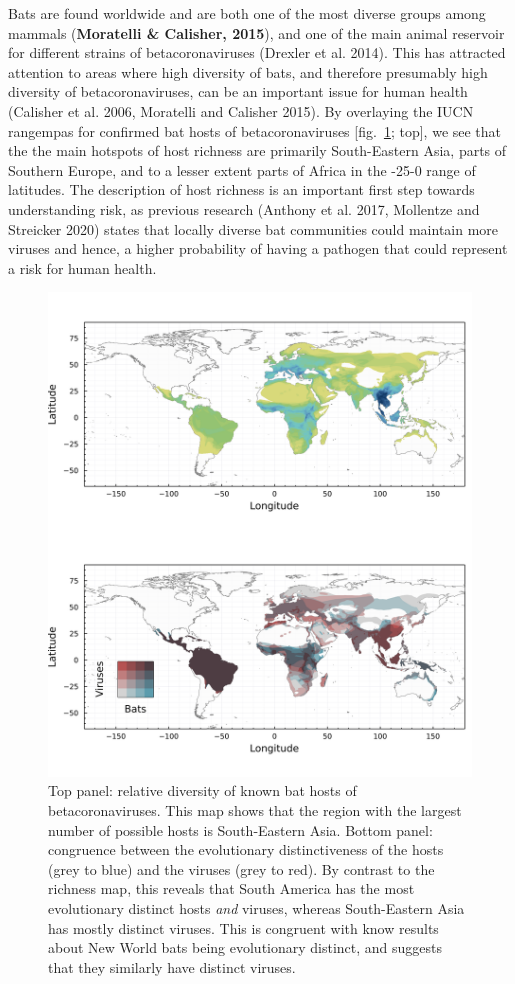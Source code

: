 \documentclass[11pt]{article}
\makeatletter
\def\maxwidth{\ifdim\Gin@nat@width>\linewidth\linewidth
\else\Gin@nat@width\fi}
\let\Oldincludegraphics\includegraphics
\renewcommand{\includegraphics}[1]{\Oldincludegraphics[width=\maxwidth]{#1}}
\makeatother
\begin{document}
Bats are found worldwide and are both one of the most diverse groups
among mammals (\textbf{Moratelli \& Calisher, 2015}), and one of the
main animal reservoir for different strains of betacoronaviruses
(Drexler et al. 2014). This has attracted attention to areas where high
diversity of bats, and therefore presumably high diversity of
betacoronaviruses, can be an important issue for human health (Calisher
et al. 2006, Moratelli and Calisher 2015). By overlaying the IUCN
rangempas for confirmed bat hosts of betacoronaviruses
{[}fig.~\ref{fig:richness}; top{]}, we see that the the main hotspots of
host richness are primarily South-Eastern Asia, parts of Southern
Europe, and to a lesser extent parts of Africa in the -25-0 range of
latitudes. The description of host richness is an important first step
towards understanding risk, as previous research (Anthony et al. 2017,
Mollentze and Streicker 2020) states that locally diverse bat
communities could maintain more viruses and hence, a higher probability
of having a pathogen that could represent a risk for human health.

\begin{figure}
\hypertarget{fig:richness}{%
\centering
\includegraphics{figures/combined_richness.png}
\caption{Top panel: relative diversity of known bat hosts of
betacoronaviruses. This map shows that the region with the largest
number of possible hosts is South-Eastern Asia. Bottom panel: congruence
between the evolutionary distinctiveness of the hosts (grey to blue) and
the viruses (grey to red). By contrast to the richness map, this reveals
that South America has the most evolutionary distinct hosts \emph{and}
viruses, whereas South-Eastern Asia has mostly distinct viruses. This is
congruent with know results about New World bats being evolutionary
distinct, and suggests that they similarly have distinct
viruses.}\label{fig:richness}
}
\end{figure}
\end{document}
